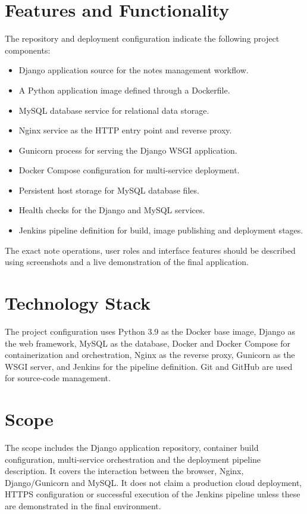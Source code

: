 \documentclass[12pt,a4paper,oneside]{report}
\begin{document}
\section{Features and Functionality}
The repository and deployment configuration indicate the following project components:
\begin{itemize}[leftmargin=0.4in]
\item Django application source for the notes management workflow.
\item A Python application image defined through a Dockerfile.
\item MySQL database service for relational data storage.
\item Nginx service as the HTTP entry point and reverse proxy.
\item Gunicorn process for serving the Django WSGI application.
\item Docker Compose configuration for multi-service deployment.
\item Persistent host storage for MySQL database files.
\item Health checks for the Django and MySQL services.
\item Jenkins pipeline definition for build, image publishing and deployment stages.
\end{itemize}
The exact note operations, user roles and interface features should be described using screenshots and a live demonstration of the final application.

\section{Technology Stack}
The project configuration uses Python 3.9 as the Docker base image, Django as the web framework, MySQL as the database, Docker and Docker Compose for containerization and orchestration, Nginx as the reverse proxy, Gunicorn as the WSGI server, and Jenkins for the pipeline definition. Git and GitHub are used for source-code management.

\section{Scope}
The scope includes the Django application repository, container build configuration, multi-service orchestration and the deployment pipeline description. It covers the interaction between the browser, Nginx, Django/Gunicorn and MySQL. It does not claim a production cloud deployment, HTTPS configuration or successful execution of the Jenkins pipeline unless these are demonstrated in the final environment.
\end{document}
